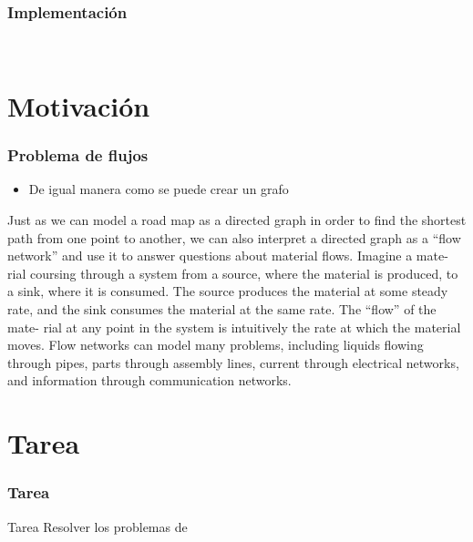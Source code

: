 \documentclass{beamer}
\begin{document}
	
	\begin{frame}
		\frametitle{Implementación}
		\begin{lstlisting}
			
		\end{lstlisting}
	\end{frame}

\section{Motivación}

	\begin{frame}
		\frametitle{Problema de flujos}
		\begin{itemize}
			\item De igual manera como se puede crear un grafo 
		\end{itemize}
		
		Just as we can model a road map as a directed graph in order to find the shortest path from one point to another, we can also interpret a directed graph as a “flow network” and use it to answer questions about material flows. Imagine a mate- rial coursing through a system from a source, where the material is produced, to a sink, where it is consumed. The source produces the material at some steady rate, and the sink consumes the material at the same rate. The “flow” of the mate- rial at any point in the system is intuitively the rate at which the material moves. Flow networks can model many problems, including liquids flowing through pipes, parts through assembly lines, current through electrical networks, and information through communication networks.
	\end{frame}
	


\section{Tarea}
	\begin{frame}[fragile]
		\frametitle{Tarea}
		\begin{alertblock}{Tarea}
			Resolver los problemas de \url{}
		\end{alertblock}
	\end{frame}
\end{document}
